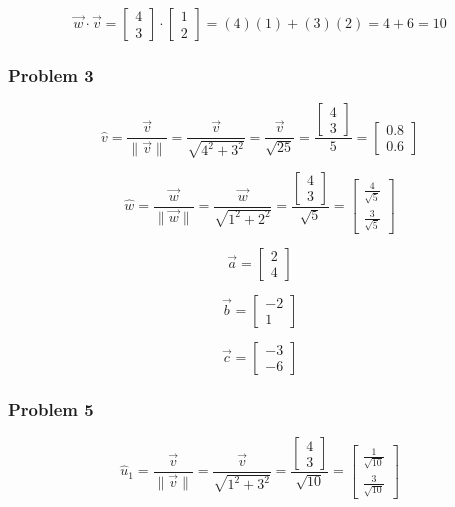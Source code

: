 \documentclass[12pt]{article}
\begin{document}
\[ \vec{w} \cdot \vec{v} = 
\begin{bmatrix} 4 \\ 3 \end{bmatrix} \cdot 
\begin{bmatrix} 1 \\ 2 \end{bmatrix} = 
(4)(1) + (3)(2) = 4 + 6 = 10 \]

\subsubsection*{Problem 3}
\[ \hat v = \frac{\vec{v}}{ \lVert \vec{v} \rVert } 
= \frac{\vec{v}}{ \sqrt{4^2 + 3^2} }
= \frac{\vec{v}}{ \sqrt{25} }
= \frac{\begin{bmatrix} 4 \\ 3 \end{bmatrix}}{ 5 }
= \begin{bmatrix} 0.8 \\ 0.6 \end{bmatrix} \]

\[ \hat w = \frac{\vec{w}}{ \lVert \vec{w} \rVert } 
= \frac{\vec{w}}{ \sqrt{1^2 + 2^2} }
= \frac{\begin{bmatrix} 4 \\ 3 \end{bmatrix}}{ \sqrt{5} }
= \begin{bmatrix} \frac{4}{\sqrt{5}} \\ \frac{3}{\sqrt{5}} \end{bmatrix} \]

\[ \vec{a} = \begin{bmatrix} 2 \\ 4 \end{bmatrix} \]

\[ \vec{b} = \begin{bmatrix} -2 \\ 1 \end{bmatrix} \]

\[ \vec{c} = \begin{bmatrix} -3 \\ -6 \end{bmatrix} \]

\subsubsection*{Problem 5}
\[ \hat u_1 = \frac{\vec{v}}{ \lVert \vec{v} \rVert } 
= \frac{\vec{v}}{ \sqrt{1^2 + 3^2} }
= \frac{\begin{bmatrix} 4 \\ 3 \end{bmatrix}}{ \sqrt{10} }
= \begin{bmatrix} \frac{1}{\sqrt{10}} \\ \frac{3}{\sqrt{10}} \end{bmatrix} \]
\end{document}
